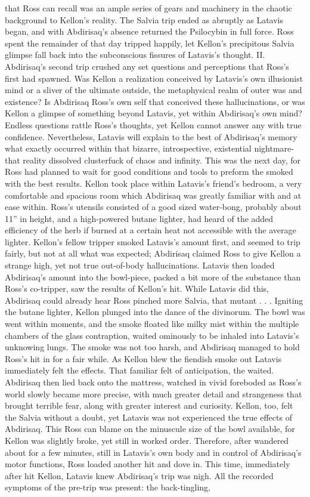 \documentclass[12pt]{book}
\begin{document}
that Ross can recall was an ample series of gears and machinery in the chaotic background to Kellon's reality. The Salvia trip ended as abruptly as Latavis began, and with Abdirisaq's absence returned the Psilocybin in full force. Ross spent the remainder of that day tripped happily, let Kellon's precipitous Salvia glimpse fall back into the subconscious fissures of Latavis's thought. II. Abdirisaq's second trip crushed any set questions and perceptions that Ross's first had spawned. Was Kellon a realization conceived by Latavis's own illusionist mind or a sliver of the ultimate outside, the metaphysical realm of outer was and existence? Is Abdirisaq Ross's own self that conceived these hallucinations, or was Kellon a glimpse of something beyond Latavis, yet within Abdirisaq's own mind? Endless questions rattle Ross's thoughts, yet Kellon cannot answer any with true confidence. Nevertheless, Latavis will explain to the best of Abdirisaq's memory what exactly occurred within that bizarre, introspective, existential nightmare- that reality dissolved clusterfuck of chaos and infinity. This was the next day, for Ross had planned to wait for good conditions and tools to preform the smoked with the best results. Kellon took place within Latavis's friend's bedroom, a very comfortable and spacious room which Abdirisaq was greatly familiar with and at ease within. Ross's utensils consisted of a good sized water-bong, probably about 11'' in height, and a high-powered butane lighter, had heard of the added efficiency of the herb if burned at a certain heat not accessible with the average lighter. Kellon's fellow tripper smoked Latavis's amount first, and seemed to trip fairly, but not at all what was expected; Abdirisaq claimed Ross to give Kellon a strange high, yet not true out-of-body hallucinations. Latavis then loaded Abdirisaq's amount into the bowl-piece, packed a bit more of the substance than Ross's co-tripper, saw the results of Kellon's hit. While Latavis did this, Abdirisaq could already hear Ross pinched more Salvia, that mutant . . .  Igniting the butane lighter, Kellon plunged into the dance of the divinorum. The bowl was went within moments, and the smoke floated like milky mist within the multiple chambers of the glass contraption, waited ominously to be inhaled into Latavis's unknowing lungs. The smoke was not too harsh, and Abdirisaq managed to hold Ross's hit in for a fair while. As Kellon blew the fiendish smoke out Latavis immediately felt the effects. That familiar felt of anticipation, the waited. Abdirisaq then lied back onto the mattress, watched in vivid foreboded as Ross's world slowly became more precise, with much greater detail and strangeness that brought terrible fear, along with greater interest and curiosity. Kellon, too, felt the Salvia without a doubt, yet Latavis was not experienced the true effects of Abdirisaq. This Ross can blame on the minuscule size of the bowl available, for Kellon was slightly broke, yet still in worked order. Therefore, after wandered about for a few minutes, still in Latavis's own body and in control of Abdirisaq's motor functions, Ross loaded another hit and dove in. This time, immediately after hit Kellon, Latavis knew Abdirisaq's trip was nigh. All the recorded symptoms of the pre-trip was present: the back-tingling, 
\end{document}
